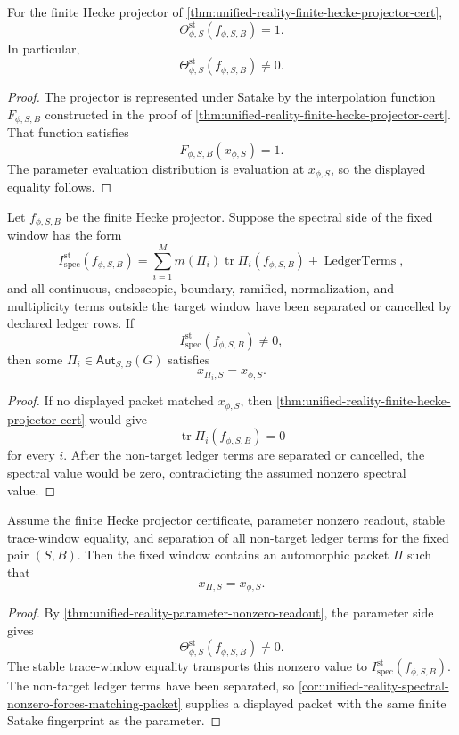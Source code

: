 \begin{theorem}
\label{thm:unified-reality-parameter-nonzero-readout}
For the finite Hecke projector of
\autoref{thm:unified-reality-finite-hecke-projector-cert},
$$
\Theta_{\phi,S}^{\mathrm{st}}(f_{\phi,S,B})=1.
$$
In particular,
$$
\Theta_{\phi,S}^{\mathrm{st}}(f_{\phi,S,B})\ne0.
$$
\end{theorem}
\begin{proof}
The projector is represented under Satake by the interpolation function
$F_{\phi,S,B}$ constructed in the proof of
\autoref{thm:unified-reality-finite-hecke-projector-cert}. That function
satisfies
$$
F_{\phi,S,B}(x_{\phi,S})=1.
$$
The parameter evaluation distribution is evaluation at $x_{\phi,S}$,
so the displayed equality follows.
\end{proof}

\begin{corollary}
\label{cor:unified-reality-spectral-nonzero-forces-matching-packet}
Let $f_{\phi,S,B}$ be the finite Hecke projector. Suppose the spectral
side of the fixed window has the form
$$
I_{\mathrm{spec}}^{\mathrm{st}}(f_{\phi,S,B})
=
\sum_{i=1}^{M}
m(\Pi_i)\operatorname{tr}\Pi_i(f_{\phi,S,B})
+\operatorname{LedgerTerms},
$$
and all continuous, endoscopic, boundary, ramified, normalization, and
multiplicity terms outside the target window have been separated or
cancelled by declared ledger rows. If
$$
I_{\mathrm{spec}}^{\mathrm{st}}(f_{\phi,S,B})\ne0,
$$
then some $\Pi_i\in\mathsf{Aut}_{S,B}(G)$ satisfies
$$
x_{\Pi_i,S}=x_{\phi,S}.
$$
\end{corollary}
\begin{proof}
If no displayed packet matched $x_{\phi,S}$, then
\autoref{thm:unified-reality-finite-hecke-projector-cert} would give
$$
\operatorname{tr}\Pi_i(f_{\phi,S,B})=0
$$
for every $i$. After the non-target ledger terms are separated or
cancelled, the spectral value would be zero, contradicting the assumed
nonzero spectral value.
\end{proof}

\begin{theorem}
\label{thm:unified-reality-fixed-window-trace-realization}
Assume the finite Hecke projector certificate, parameter nonzero
readout, stable trace-window equality, and separation of all non-target
ledger terms for the fixed pair $(S,B)$. Then the fixed window contains
an automorphic packet $\Pi$ such that
$$
x_{\Pi,S}=x_{\phi,S}.
$$
\end{theorem}
\begin{proof}
By
\autoref{thm:unified-reality-parameter-nonzero-readout}, the parameter
side gives
$$
\Theta_{\phi,S}^{\mathrm{st}}(f_{\phi,S,B})\ne0.
$$
The stable trace-window equality transports this nonzero value to
$I_{\mathrm{spec}}^{\mathrm{st}}(f_{\phi,S,B})$. The non-target ledger
terms have been separated, so
\autoref{cor:unified-reality-spectral-nonzero-forces-matching-packet}
supplies a displayed packet with the same finite Satake fingerprint as
the parameter.
\end{proof}

